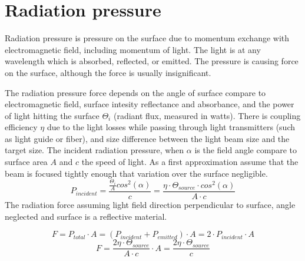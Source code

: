 \documentclass[\main/master.tex]{subfiles}
\begin{document}
\section{Radiation pressure}
Radiation pressure is pressure on the surface due to momentum exchange with electromagnetic field, including momentum of light. The light is at any wavelength which is absorbed, reflected, or emitted. The pressure is causing force on the surface, although the force is usually insignificant.
  
\par
The radiation pressure force depends on the angle of surface compare to electromagnetic field, surface intesity reflectance and absorbance, and the power of light hitting the surface $\Theta_i$ (radiant flux, measured in watts). There is coupling efficiency $\eta$ due to the light losses while passing through light transmitters (such as light guide or fiber), and size difference between the light beam size and the target size. The incident radiation pressure, when $\alpha$ is the field angle compare to surface area $A$ and $c$ the speed of light. As a first approximation assume that the beam is focused tightly enough that variation over the surface negligible. 
\begin{equation}
P_{incident} = \frac{\frac{\Theta_i}{A}cos^2(\alpha)}{c} = \frac{\eta\cdot \Theta_{source}\cdot cos^2(\alpha)}{{A\cdot c}} \label{eqn:energy-mass-equivalence-relation}
\end{equation}
The radiation force assuming light field direction perpendicular to surface, angle neglected and surface is a reflective material.

\begin{equation}
F = P_{total}\cdot A = (P_{incident}+P_{emitted})\cdot A = 2\cdot P_{incident}\cdot A\label{eqn:energy-mass-equivalence-relation}
\end{equation}
\begin{equation}
F = \frac{2\eta\cdot\Theta_{source}}{{A\cdot c}}\cdot A = \frac{2\eta\cdot\Theta_{source}}{{c}} \label{eqn:energy-mass-equivalence-relation}
\end{equation}




 
\end{document}
